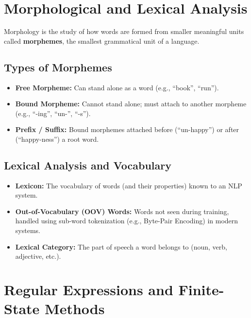 \documentclass[11pt,a4paper]{article}
\begin{document}
\section{Morphological and Lexical Analysis}

\begin{definitionbox}[Morphology]
Morphology is the study of how words are formed from smaller meaningful units called \textbf{morphemes}, the smallest grammatical unit of a language.
\end{definitionbox}

\subsection{Types of Morphemes}
\begin{itemize}[leftmargin=*]
  \item \textbf{Free Morpheme:} Can stand alone as a word (e.g., ``book'', ``run'').
  \item \textbf{Bound Morpheme:} Cannot stand alone; must attach to another morpheme (e.g., ``-ing'', ``un-'', ``-s'').
  \item \textbf{Prefix / Suffix:} Bound morphemes attached before (``un-happy'') or after (``happy-ness'') a root word.
\end{itemize}

\subsection{Lexical Analysis and Vocabulary}
\begin{itemize}[leftmargin=*]
  \item \textbf{Lexicon:} The vocabulary of words (and their properties) known to an NLP system.
  \item \textbf{Out-of-Vocabulary (OOV) Words:} Words not seen during training, handled using sub-word tokenization (e.g., Byte-Pair Encoding) in modern systems.
  \item \textbf{Lexical Category:} The part of speech a word belongs to (noun, verb, adjective, etc.).
\end{itemize}

\section{Regular Expressions and Finite-State Methods}
\end{document}
